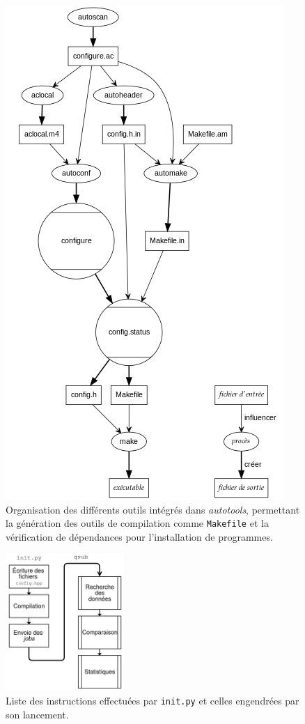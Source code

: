	\begin{figure}[h]
		\centering
		\includegraphics[height=0.6\textheight]{img/autotools.png}
		\caption[Organisation des outils d'\emph{autotools}]{Organisation des différents outils intégrés dans \emph{autotools}, permettant la génération des outils de compilation comme \texttt{Makefile} et la vérification de dépendances pour l'installation de programmes.}
		\label{fig:autotools}
	\end{figure}

	\begin{figure}[h]
		\centering
		\includegraphics[width=0.4\textwidth]{img/init.png}
		\caption[Instructions effectuées par \texttt{init.py}]{Liste des instructions effectuées par \texttt{init.py} et celles engendrées par son lancement.}
		\label{fig:init}
	\end{figure}

